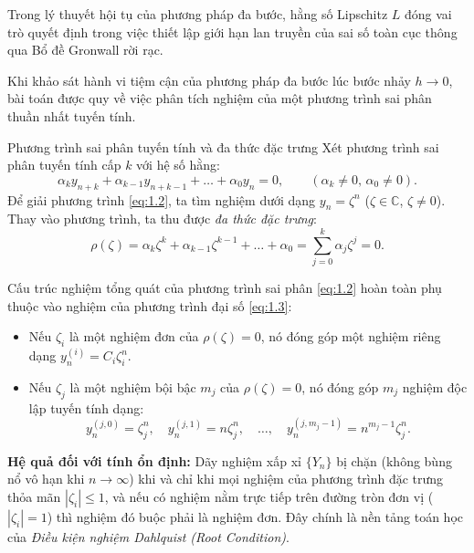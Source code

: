 Trong lý thuyết hội tụ của phương pháp đa bước, hằng số Lipschitz $L$ đóng vai trò quyết định trong việc thiết lập giới hạn lan truyền của sai số toàn cục thông qua Bổ đề Gronwall rời rạc.

Khi khảo sát hành vi tiệm cận của phương pháp đa bước lúc bước nhảy $h \to 0$, bài toán được quy về việc phân tích nghiệm của một phương trình sai phân thuần nhất tuyến tính.
\begin{baitapbox}{Phương trình sai phân tuyến tính và đa thức đặc trưng}
    Xét phương trình sai phân tuyến tính cấp $k$ với hệ số hằng:
\begin{equation}
    \alpha_k y_{n+k} + \alpha_{k-1} y_{n+k-1} + \dots + \alpha_0 y_n = 0, \qquad (\alpha_k \neq 0, \, \alpha_0 \neq 0). \tag{1.2} \label{eq:1.2}
\end{equation}
\noindent Để giải phương trình \eqref{eq:1.2}, ta tìm nghiệm dưới dạng $y_n = \zeta^n$ ($\zeta \in \mathbb{C}$, $\zeta \neq 0$). Thay vào phương trình, ta thu được \textit{đa thức đặc trưng}:
\begin{equation}
    \rho(\zeta) = \alpha_k \zeta^k + \alpha_{k-1} \zeta^{k-1} + \dots + \alpha_0 = \sum_{j=0}^k \alpha_j \zeta^j = 0. \tag{1.3} \label{eq:1.3}
\end{equation}

\noindent Cấu trúc nghiệm tổng quát của phương trình sai phân \eqref{eq:1.2} hoàn toàn phụ thuộc vào nghiệm của phương trình đại số \eqref{eq:1.3}:
\begin{itemize}
    \item Nếu $\zeta_i$ là một nghiệm đơn của $\rho(\zeta) = 0$, nó đóng góp một nghiệm riêng dạng $y_n^{(i)} = C_i \zeta_i^n$.
    \item Nếu $\zeta_j$ là một nghiệm bội bậc $m_j$ của $\rho(\zeta) = 0$, nó đóng góp $m_j$ nghiệm độc lập tuyến tính dạng:
    \[
        y_n^{(j, 0)} = \zeta_j^n, \quad y_n^{(j, 1)} = n \zeta_j^n, \quad \dots, \quad y_n^{(j, m_j-1)} = n^{m_j-1} \zeta_j^n.
    \]
\end{itemize}
\end{baitapbox}

\noindent \textbf{Hệ quả đối với tính ổn định:} Dãy nghiệm xấp xỉ $\{Y_n\}$ bị chặn (không bùng nổ vô hạn khi $n \to \infty$) khi và chỉ khi mọi nghiệm của phương trình đặc trưng thỏa mãn $|\zeta_i| \le 1$, và nếu có nghiệm nằm trực tiếp trên đường tròn đơn vị ($|\zeta_i| = 1$) thì nghiệm đó buộc phải là nghiệm đơn. Đây chính là nền tảng toán học của \textit{Điều kiện nghiệm Dahlquist (Root Condition)}.

